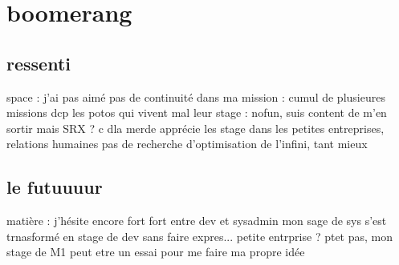 \section{boomerang}
\subsection{ressenti}
space : j'ai pas aimé
pas de continuité dans ma mission : cumul de plusieures missions dcp
les potos qui vivent mal leur stage : nofun, suis content de m'en sortir mais SRX ? c dla merde
apprécie les stage dans les petites entreprises, relations humaines
pas de recherche d'optimisation de l'infini, tant mieux
\subsection{le futuuuur}
matière : j'hésite encore fort fort entre dev et sysadmin
mon sage de sys s'est trnasformé en stage de dev sans faire expres...
petite entrprise ? ptet pas, mon stage de M1 peut etre un essai pour me faire ma propre idée
